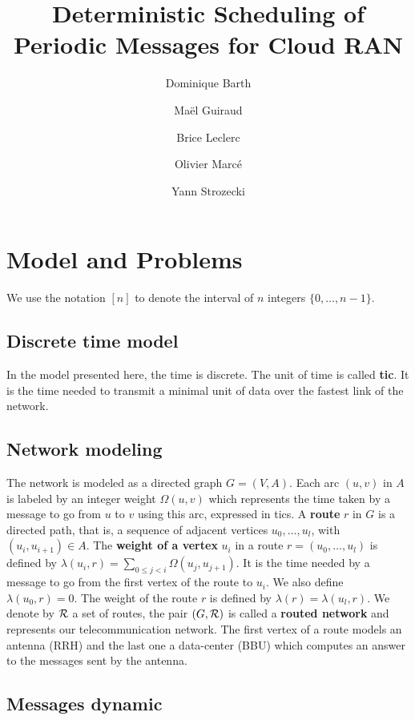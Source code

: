 \documentclass[10pt]{article}
\title{Deterministic Scheduling of Periodic Messages for Cloud RAN}
\author[1]{Dominique Barth}
\author[1,2]{Ma\"el Guiraud}
\author[2]{Brice Leclerc}
\author[2]{Olivier Marc\'e}
\author[1]{Yann Strozecki}
\affil[1]{David Laboratory, UVSQ}
\affil[2]{Nokia Bell Labs France}
\newcommand{\todo}[1]{{\color{red} TODO: {#1}}}
\begin{document}
\maketitle\section{Model and Problems}\label{sec:def}

We use the notation $[n]$ to denote the interval of $n$ integers $\{0,\dots,n-1\}$.

  \subsection{Discrete time model}
  In the model presented here, the time is discrete. The unit of time is called  {\bf tic}. It is the time needed to transmit a minimal unit of data over the fastest link of the network.
  \subsection{Network modeling}
  
The network is modeled as a directed graph $G=(V,A)$. Each arc  $(u,v)$ in $A$ is labeled by an integer weight $\Omega(u,v)$ which represents the time taken by a message to go from $u$ to $v$ using this arc, expressed in tics. A {\bf route} $r$ in $G$ is a directed path, that is, a sequence of adjacent vertices $u_0, \ldots , u_{l}$, with $(u_i,u_{i+1}) \in A$.  The {\bf weight of a vertex} $u_i$ in a route $r=(u_0,\dots,u_l)$ is defined by $\lambda(u_i,r)= \sum\limits_{0 \leq j <i} \Omega(u_j, u_{j+1})$. It is the time needed by a message to go from the first vertex of the route to $u_i$. We also define $\lambda(u_0,r)=0$. The weight of the route $r$ is defined by $\lambda (r)= \lambda (u_l,r)$.
We denote by $\cal R$ a set of routes, the pair $(G,\cal R)$ is called a {\bf routed network} and represents our telecommunication network.
The first vertex of a route models an antenna (RRH) and the last one a data-center (BBU) which computes an answer to the messages sent by the antenna.

   \subsection{Messages dynamic}
	 
    
\end{document}

